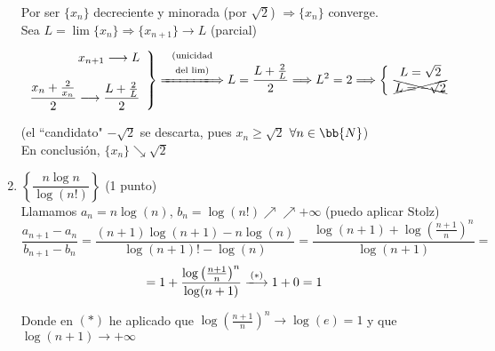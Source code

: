 \documentclass[12pt]{article}
\begin{document}
\begin{ejercicio}[2 puntos]
\begin{enumerate}
            Por ser $\{x_n\}$ decreciente y minorada (por $\sqrt{2}$) $\Longrightarrow \{x_n\}$ converge.\\
            Sea $L=\lim\{x_n\} \Longrightarrow \{x_{n+1}\} \longrightarrow L$ (parcial)
            \[
                \left .
                \begin{array}{r}
                     x_{n+1} \longrightarrow L \\\\
                     \dfrac{x_n+\frac{2}{x_n}}{2} \longrightarrow \dfrac{L+\frac{2}{L}}{2}
                \end{array}
                \right\} \xLongrightarrow{\begin{array}{c}
                    \text{\scriptsize{(unicidad}} \\
                    \text{\scriptsize{del lim)}} 
                \end{array}} L=\dfrac{L+\frac{2}{L}}{2} \Longrightarrow L^2 =2 \Longrightarrow 
                \left\{
                \begin{array}{c}
                     L=\sqrt{2}\\
                     \xcancel{L=-\sqrt{2}}
                \end{array}
                \right.
            \]

            (el ``candidato" $-\sqrt{2}$ se descarta, pues $x_n \geq \sqrt{2}$ $\forall n \in \bb{N}$)\\
            En conclusión, $\{x_n\} \searrow \sqrt{2}$
            
            \item $\left\{ \dfrac{n \log n}{\log(n!)} \right\}$ (1 punto)\\
            
            Llamamos $a_n=n \log(n)$, $b_n=\log(n!) \nearrow \nearrow +\infty$ (puedo aplicar Stolz)
            \[ 
                \dfrac{a_{n+1} - a_n}{b_{n+1}-b_n} = \dfrac{(n+1) \log(n+1) - n \log(n)}{\log(n+1)! - \log(n)} = \dfrac{\log(n+1) + \log\left( \frac{n+1}{n}\right)^n}{\log(n+1)} =
            \]
            \[
            = 1 + \dfrac{\log\left( \frac{n+1}{n}\right)^n}{\log(n+1)} \xlongrightarrow{(\ast)} 1+0 = 1
            \]

            Donde en $(\ast)$ he aplicado que $\log\left( \frac{n+1}{n}\right)^n \rightarrow \log(e)=1$ y que $\log(n+1) \rightarrow +\infty$
            
        \end{enumerate}
    \end{ejercicio}
\end{document}
